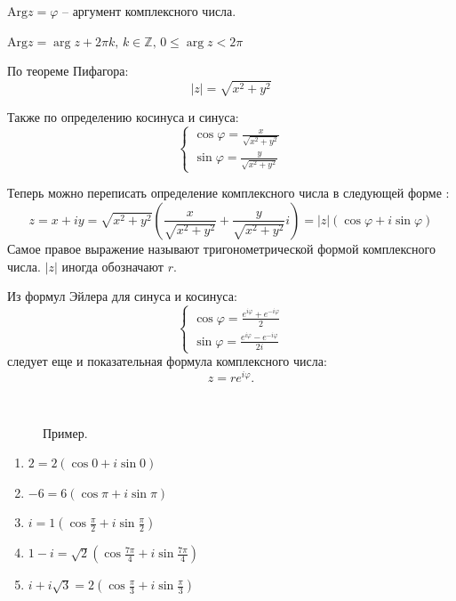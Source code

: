 \documentclass[12pt, a4paper]{article}
\begin{document}
    \( \mathrm{Arg} z  = \varphi\)  -- аргумент комплексного числа.

    \( \mathrm{Arg} z = \arg z + 2 \pi k, \, k \in \mathbb{Z}, \, 0 \le \arg z < 2 \pi \)

    По теореме Пифагора: \[
        |z| = \sqrt{x^2 + y^2} 
    \] 

    Также по определению косинуса и синуса:
    \[
        \begin{cases}
            \cos  \varphi = \frac{x}{\sqrt{x^2 + y^2} } \\
            \sin  \varphi = \frac{y}{\sqrt{x^2 + y^2} }
        \end{cases}
    \] 

    Теперь можно переписать определение комплексного числа в следующей форме : \[
        z = x + iy = \sqrt{x^2 + y^2} \left( \frac{x}{\sqrt{x^2+y^2} } + \frac{y}{\sqrt{x^2 + y^2} }i \right)  = |z| ( \cos \varphi + i \sin \varphi)
    \] 
    Самое правое выражение называют тригонометрической формой комплексного числа. \( |z| \) иногда обозначают \( r \).

    Из формул Эйлера для синуса и косинуса: \[
        \begin{cases}
            \cos \varphi = \frac{e^{i\varphi} + e^{-i\varphi}  }{2} \\
            \sin  \varphi = \frac{e^{i\varphi} - e^{-i\varphi}  }{2i}
        \end{cases}
    \] следует еще и показательная формула комплексного числа: \[
        z = re^{i\varphi}. 
    \] 

    \begin{exmp}
        \(  \)
        \begin{figure}[htbp]
            \caption{Пример.}
        \end{figure}

        \begin{enumerate}
            \item \( 2 = 2(\cos 0 + i \sin 0) \)
            \item \( -6 = 6(\cos  \pi  + i \sin  \pi ) \)
            \item \( i = 1 (\cos  \frac{\pi}{2} + i \sin \frac{\pi}{2})  \)
            \item \( 1 - i = \sqrt{2} (\cos \frac{7 \pi }{4} + i \sin \frac{7 \pi }{4}) \)
            \item \( i + i\sqrt{3}  = 2 (\cos \frac{\pi}{3} + i \sin \frac{\pi}{3}) \)
        \end{enumerate}
    \end{exmp}
\end{document}
